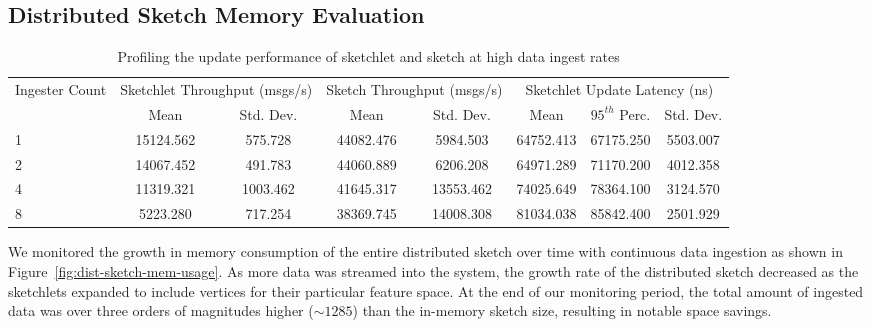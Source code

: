 \subsection{Distributed Sketch Memory Evaluation}
\begin{table}[h]
    \renewcommand{\arraystretch}{1.3}
    \caption{Profiling the update performance of sketchlet and sketch at high data ingest rates}
    \label{tab:throughput}
    \begin{center}
        \begin{tabularx}{0.9\textwidth}{|X|c|c|c|c|c|c|c|}
            \hline
            \multirow{2}{*}{Ingester Count} & \multicolumn{2}{c|}{\cellcolor[gray]{0.7}Sketchlet Throughput (msgs/s)} &\multicolumn{2}{c|}{\cellcolor[gray]{0.7}Sketch Throughput (msgs/s)} & \multicolumn{3}{c|}{\cellcolor[gray]{0.7}Sketchlet Update Latency (ns)} \\
            \cline{2-5}
             & \cellcolor[gray]{0.9}Mean & \cellcolor[gray]{0.9}Std. Dev.  &  \cellcolor[gray]{0.9}Mean & \cellcolor[gray]{0.9}Std. Dev.
             &  \cellcolor[gray]{0.9}Mean & \cellcolor[gray]{0.9}$95^{th}$ Perc. & \cellcolor[gray]{0.9}Std. Dev. \\
            \hline
            1 & 15124.562 & 575.728 & 44082.476 & 5984.503 & 64752.413 & 67175.250 & 5503.007 \\
            \hline
            2 & 14067.452 & 491.783 & 44060.889 & 6206.208 & 64971.289 & 71170.200 & 4012.358 \\
            \hline
            4 & 11319.321 & 1003.462 & 41645.317 & 13553.462 & 74025.649 & 78364.100 & 3124.570 \\
            \hline
            8 & 5223.280 & 717.254 & 38369.745 & 14008.308 & 81034.038 & 85842.400 & 2501.929 \\
            \hline
        \end{tabularx}
    \end{center}
\end{table}
%
We monitored the growth in memory consumption of the entire distributed sketch over time with continuous data ingestion as shown in Figure~\ref{fig:dist-sketch-mem-usage}. As more data was streamed into the system, the growth rate of the distributed sketch decreased as the sketchlets expanded to include vertices for their particular feature space.  At the end of our monitoring period, the total amount of ingested data was over three orders of magnitudes higher ($\sim 1285$) than the in-memory sketch size, resulting in notable space savings.
